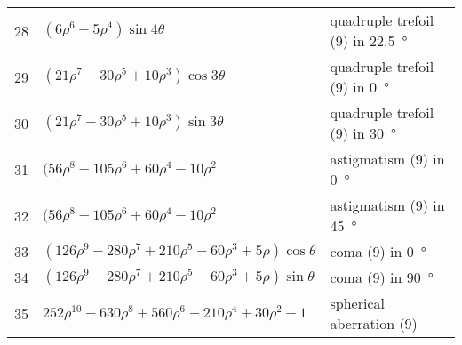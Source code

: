 \begin{center}
\begin{longtable}{cll}
28    &   $ (6\rho^6 - 5 \rho^4)\sin 4 \theta $                                     &  quadruple trefoil (9) in \SI{22.5}{\degree} \\
29    &   $ (21\rho^7 - 30 \rho^5 + 10\rho^3 )\cos 3\theta $                        &  quadruple trefoil (9) in \SI{0}{\degree} \\
30    &   $ (21\rho^7 - 30 \rho^5 + 10\rho^3 )\sin 3\theta $                        &  quadruple trefoil (9) in \SI{30}{\degree} \\
31    &   $ (56\rho^8 - 105\rho^6 + 60\rho^4 - 10\rho^2 $                           &  astigmatism (9) in \SI{0}{\degree} \\
32    &   $ (56\rho^8 - 105\rho^6 + 60\rho^4 - 10\rho^2 $                           &  astigmatism (9) in \SI{45}{\degree} \\
33    &   $ (126 \rho^9 - 280 \rho^7 + 210 \rho^5 - 60\rho^3 + 5 \rho)\cos\theta $   & coma (9) in \SI{0}{\degree} \\
34    &   $ (126 \rho^9 - 280 \rho^7 + 210 \rho^5 - 60\rho^3 + 5 \rho)\sin\theta $   & coma (9) in \SI{90}{\degree} \\
35    &   $ 252 \rho^{10} - 630 \rho^8 + 560 \rho^6 - 210 \rho^ 4 + 30 \rho^2 - 1 $  & spherical aberration (9) \\
\bottomrule
\end{longtable}
\end{center}
